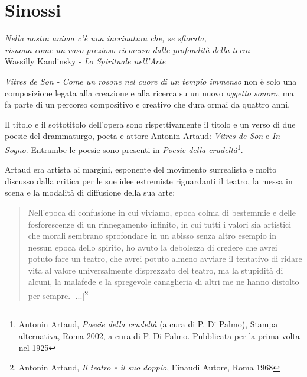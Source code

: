 
\chapter{Sinossi}
\label{chp:Sinossi}

	\begin{flushright}
		\textit{Nella nostra anima c'\`e una incrinatura che, se sfiorata, \\
		risuona come un vaso prezioso riemerso dalle profondit\`a della terra} \\
		Wassilly Kandinsky - \emph{Lo Spirituale nell'Arte}
	\end{flushright}

\textit{Vitres de Son - Come un rosone nel cuore di un tempio immenso} non è solo una composizione legata alla creazione e alla ricerca su un nuovo \textit{oggetto sonoro}, ma fa parte di un percorso compositivo e creativo che dura ormai da quattro anni.

Il titolo e il sottotitolo dell'opera sono rispettivamente il titolo e un verso di due poesie del drammaturgo, poeta e attore Antonin Artaud: \textit{Vitres de Son} e \textit{In Sogno}. Entrambe le poesie sono presenti in \textit{Poesie della crudeltà}\footnote{Antonin Artaud, \textit{Poesie della crudeltà} (a cura di P. Di Palmo), Stampa alternativa, Roma 2002, a cura di P. Di Palmo. Pubblicata per la prima volta nel 1925}.

Artaud era artista ai margini, esponente del movimento surrealista e molto discusso dalla critica per le sue idee estremiste riguardanti il teatro, la messa in scena  e la modalità di diffusione della sua arte:

\begin{small}
\begin{quotation}
{\sf Nell'epoca di confusione in cui viviamo, epoca colma di bestemmie e delle fosforescenze di un rinnegamento infinito, in cui tutti i valori sia artistici che morali sembrano sprofondare in un abisso senza altro esempio in nessun epoca dello spirito, ho avuto la debolezza di credere che avrei potuto fare un teatro, che avrei potuto almeno avviare il tentativo di ridare vita al valore universalmente disprezzato del teatro, ma la stupidità di alcuni, la malafede e la spregevole canaglieria di altri me ne hanno distolto per sempre. [...]}\footnote{Antonin Artaud, \textit{Il teatro e il suo doppio}, Einaudi Autore, Roma 1968}
\end{quotation}
\end{small}

